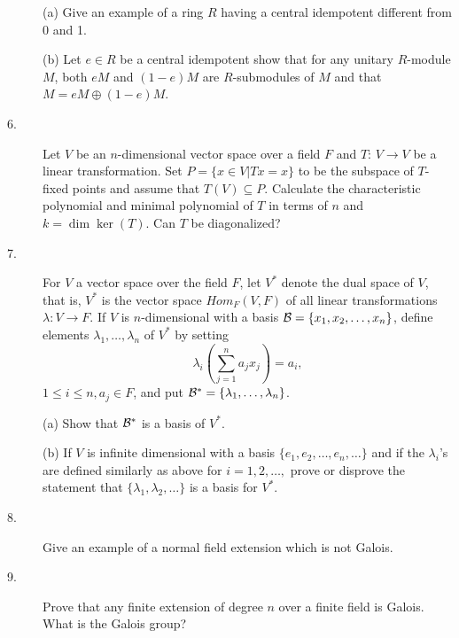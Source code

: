 \documentclass{article}
\begin{document}
\begin{description}
\item[\quad] (a)
Give an example of a ring $R$ having a central idempotent different from
0 and 1.

\item[\quad] (b)
Let $e \in R$ be a central idempotent show that for any unitary $R$-module
$M$, both $eM$ and $(1-e)M$ are $R$-submodules of $M$ and that
$M = eM \oplus (1-e)M$.

\item[6.]
Let $V$ be an $n$-dimensional vector space over a field $F$ and $T$:
$V \to V$ be a linear transformation. Set $P=\{x \in V | Tx = x\}$ to be
the subspace of $T$-fixed points and assume that $T(V) \subseteq P$.
Calculate the characteristic polynomial and minimal polynomial of $T$ in
terms of $n$ and $k = \dim \ker(T)$. Can $T$ be diagonalized?

\item[7.]
For $V$ a vector space over the field $F$, let $V^\ast$ denote the dual
space of $V$, that is, $V^\ast$ is the vector space
$Hom_F (V,F)$ of all linear transformations $\lambda : V \to F$.
If $V$ is $n$-dimensional with a basis
${\cal B} = \{x_1, x_2, \dots, x_n\}$, define elements
$\lambda_1, \dots, \lambda_n$ of $V^\ast$ by setting
$$\lambda_i \left( \sum^n_{j=1} a_jx_j \right) = a_i,$$
$1 \leq i \leq n, a_j \in F$, and put
${\cal B}^\ast = \{\lambda_1, \dots, \lambda_n\}$.

\item[\quad] (a)
Show that ${\cal B}^\ast$ is a basis of $V^\ast$.

\item[\quad] (b)
If $V$ is infinite dimensional with a basis $\{e_1, e_2, \dots, e_n, \dots\}$
and if the $\lambda_i$'s are defined similarly as above for $i= 1,2, \dots,$
prove or disprove the statement that $\{\lambda_1, \lambda_2, \dots\}$ is a
basis for $V^\ast$.

\item[8.]
Give an example of a normal field extension which is not Galois.

\item[9.]
Prove that any finite extension of degree $n$ over a finite field is
Galois. What is the Galois group?






\end{description}    
\end{document}
